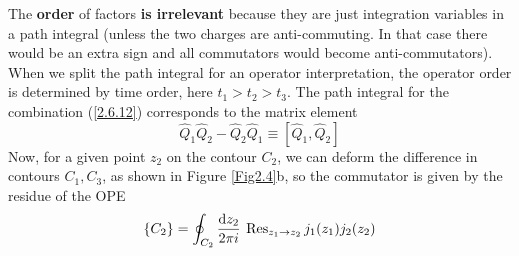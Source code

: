 The \textbf{order} of factors \textbf{is irrelevant} because they are just integration variables in a path integral (unless the two charges are anti-commuting. In that case there would be an extra sign and all commutators would become anti-commutators).    
When we split the path integral for an operator interpretation, the operator order is determined by time order, here $t_{1}>t_{2}>t_{3}$.    
The path integral for the combination (\ref{2.6.12}) corresponds to the matrix element    
\begin{equation}
	\hat{Q}_{1} \hat{Q}_{2}-\hat{Q}_{2} \hat{Q}_{1} \equiv [\hat{Q}_{1}, \hat{Q}_{2}]
\end{equation}
Now, for a given point $z_2$ on the contour $C_2$, we can deform the difference in contours $C_1, C_3$, as shown in Figure \ref{Fig2.4}b, so the commutator is given by the residue of the OPE    
\begin{equation}
	[Q_{1}, Q_{2}]\{C_{2}\}=\oint_{C_{2}} \frac{\dif z_{2}}{2 \pi \mi} \: \operatorname{Res}_{z_{1} \to z_{2}} j_{1}(z_{1}) j_{2}(z_{2}) \label{2.6.14}
\end{equation}
